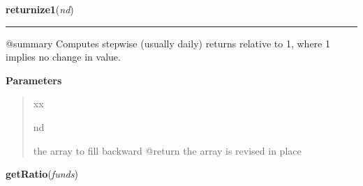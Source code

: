     \label{trunk:qstkutil:tsutil:returnize1}

    \vspace{0.5ex}

\hspace{.8\funcindent}\begin{boxedminipage}{\funcwidth}

    \raggedright \textbf{returnize1}(\textit{nd})

    \vspace{-1.5ex}

    \rule{\textwidth}{0.5\fboxrule}
\setlength{\parskip}{2ex}
    @summary Computes stepwise (usually daily) returns relative to 1, where
    1 implies no change in value.

\setlength{\parskip}{1ex}
      \textbf{Parameters}
      \vspace{-1ex}

      \begin{quote}
        \begin{Ventry}{xx}

          \item[nd]

          the array to fill backward @return the array is revised in place

        \end{Ventry}

      \end{quote}

    \end{boxedminipage}

    \label{trunk:qstkutil:tsutil:getRatio}

    \vspace{0.5ex}

\hspace{.8\funcindent}\begin{boxedminipage}{\funcwidth}

    \raggedright \textbf{getRatio}(\textit{funds})

\setlength{\parskip}{2ex}
\setlength{\parskip}{1ex}
    \end{boxedminipage}

    \label{trunk:qstkutil:tsutil:getYearRatio}


